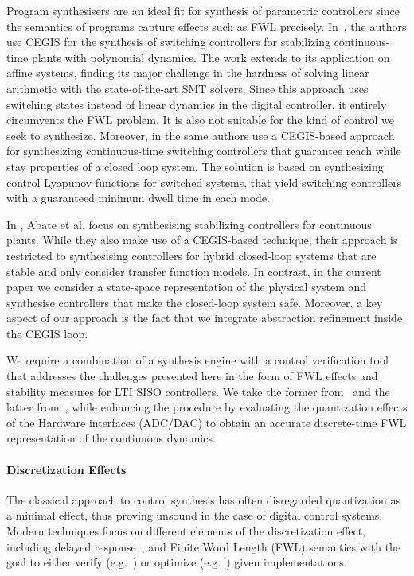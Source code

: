 \documentclass[runningheads,a4paper]{llncs}
\begin{document}
Program synthesisers are an ideal fit for synthesis of parametric
controllers since the semantics of programs capture effects such as FWL
precisely.  In~\cite{DBLP:conf/cdc/RavanbakhshS15}, the authors use CEGIS
for the synthesis of switching controllers for stabilizing continuous-time
plants with polynomial dynamics.  The work extends to its application on
affine systems, finding its major challenge in the hardness of solving
linear arithmetic with the state-of-the-art SMT solvers.  Since this
approach uses switching states instead of linear dynamics in the digital
controller, it entirely circumvents the FWL problem.  It is also not
suitable for the kind of control we seek to synthesize.
Moreover, in \cite{DBLP:conf/emsoft/RavanbakhshS16} the same authors 
use a CEGIS-based approach for synthesizing continuous-time switching
controllers that guarantee reach while stay properties of a closed
loop system. The solution is based on synthesizing control Lyapunov
functions for switched systems, that yield switching controllers with
a guaranteed minimum dwell time in each mode.

In \cite{DBLP:journals/corr/AbateBCCDKK16}, Abate et al.  focus on
synthesising stabilizing controllers for continuous plants.  While
they also make use of a CEGIS-based technique, their approach is
restricted to synthesising controllers for hybrid closed-loop systems
that are stable and only consider transfer function models.  In contrast,
in the current paper we consider a state-space
representation of the physical system and synthesise controllers that
make the closed-loop system safe.  Moreover, 
a key aspect of our approach
is the fact that we integrate abstraction
refinement inside the CEGIS loop.

We require a combination of a synthesis engine with a control
verification tool that addresses the challenges presented here in the
form of FWL effects and stability measures for LTI SISO controllers.
We take the former from~\cite{DBLP:conf/lpar/DavidKL15} and the latter
from~\cite{daes20161}, while enhancing the procedure by evaluating the
quantization effects of the Hardware interfaces (ADC/DAC) to obtain an
accurate discrete-time FWL representation of the continuous dynamics.

\paragraph{Discretization Effects}

The classical approach to control synthesis has often disregarded
quantization as a minimal effect, thus proving unsound in the case of digital control systems.
Modern techniques focus on different elements of the discretization effect, including delayed
response~\cite{Duggirala2015}, and Finite Word Length (FWL) semantics with
the goal to either verify (e.g.~\cite{daes20161}) or optimize
(e.g.~\cite{oudjida2014design}) given implementations.
\end{document}

